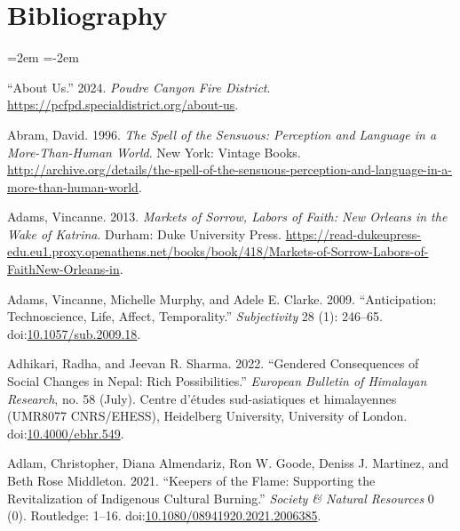 \documentclass[
]{article}
\newlength{\cslhangindent}
\newenvironment{CSLReferences}[2] %
 {\begin{list}{}{%
  \setlength{\itemindent}{0pt}
  \setlength{\leftmargin}{0pt}
  \setlength{\parsep}{0pt}
  \ifodd #1
   \setlength{\leftmargin}{\cslhangindent}
   \setlength{\itemindent}{-1\cslhangindent}
  \fi
  \setlength{\itemsep}{#2\baselineskip}}}
 {\end{list}}
\begin{document}
\clearpage

\section*{Bibliography}

\noindent
\leftskip=2em
\parindent=-2em

\label{refs}
\begin{CSLReferences}{1}{0}
{``About {Us}.''} 2024. \emph{Poudre Canyon Fire District}. \url{https://pcfpd.specialdistrict.org/about-us}.

Abram, David. 1996. \emph{The {Spell} of the {Sensuous}: {Perception} and {Language} in a {More-Than-Human World}}. New York: Vintage Books. \url{http://archive.org/details/the-spell-of-the-sensuous-perception-and-language-in-a-more-than-human-world}.

Adams, Vincanne. 2013. \emph{Markets of {Sorrow}, {Labors} of {Faith}: {New Orleans} in the {Wake} of {Katrina}}. Durham: Duke University Press. \url{https://read-dukeupress-edu.eu1.proxy.openathens.net/books/book/418/Markets-of-Sorrow-Labors-of-FaithNew-Orleans-in}.

Adams, Vincanne, Michelle Murphy, and Adele E. Clarke. 2009. {``Anticipation: {Technoscience}, Life, Affect, Temporality.''} \emph{Subjectivity} 28 (1): 246--65. doi:\href{https://doi.org/10.1057/sub.2009.18}{10.1057/sub.2009.18}.

Adhikari, Radha, and Jeevan R. Sharma. 2022. {``Gendered Consequences of Social Changes in {Nepal}: Rich Possibilities.''} \emph{European Bulletin of Himalayan Research}, no. 58 (July). Centre d'{é}tudes sud-asiatiques et himalayennes (UMR8077 CNRS/EHESS), Heidelberg University, University of London. doi:\href{https://doi.org/10.4000/ebhr.549}{10.4000/ebhr.549}.

Adlam, Christopher, Diana Almendariz, Ron W. Goode, Deniss J. Martinez, and Beth Rose Middleton. 2021. {``Keepers of the {Flame}: {Supporting} the {Revitalization} of {Indigenous Cultural Burning}.''} \emph{Society \& Natural Resources} 0 (0). Routledge: 1--16. doi:\href{https://doi.org/10.1080/08941920.2021.2006385}{10.1080/08941920.2021.2006385}.


\end{CSLReferences}
\end{document}
